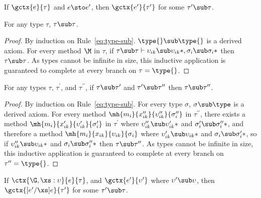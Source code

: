 \begin{theorem}[Preservation]\label{th:preservation}
  If $\gctx{e}{\tau}$ and $e \sto e^\prime$, then $\gctx{e^\prime}{\tau^\prime}$
  for some $\tau^\prime \sub \tau$.

  \begin{lemma}\label{lem:sub-reflexive}
    For any type $\tau$, $\tau \sub \tau$.

    \begin{proof}
      By induction on Rule~\ref{eq:type-sub}.  $\type{} \sub \type{}$ is a
      derived axiom.  For every method $\M$ in $\tau$, if $\tau \sub \tau \vdash
      \*\upsilon_{ik} \sub \upsilon_{ik}*, \*\sigma_i \sub \sigma_i*$ then $\tau
      \sub \tau$.  As types cannot be infinite in size, this inductive
      application is guaranteed to complete at every branch on $\tau = \type{}$.
    \end{proof}
  \end{lemma}

  \begin{lemma}\label{lem:sub-transitive}
    For any types $\tau$, $\tau^\prime$, and $\tau^{\prime\prime}$, if $\tau
    \sub \tau^\prime$ and $\tau^\prime \sub \tau^{\prime\prime}$ then $\tau \sub
    \tau^{\prime\prime}$.

    \begin{proof}
      By induction on Rule~\ref{eq:type-sub}.  For every type $\sigma$, $\sigma
      \sub \type$ is a derived axiom.  For every method
      $\mh{m_i}{x_{ik}^{\prime\prime}}{\upsilon_{ik}^{\prime\prime}}
      {\sigma_i^{\prime\prime}}$ in $\tau^{\prime\prime}$, there exists a method
      $\mh{m_i}{x_{ik}^\prime}{\upsilon_{ik}^\prime}{\sigma_i^\prime}$ in
      $\tau^\prime$ where $\*\upsilon_{ik}^{\prime\prime} \sub
      \upsilon_{ik}^\prime*$ and $\*\sigma_i^\prime \sub
      \sigma_i^{\prime\prime}*$, and therefore a method
      $\mh{m_i}{x_{ik}}{\upsilon_{ik}}{\sigma_i}$ where $\*\upsilon_{ik}^\prime
      \sub \upsilon_{ik}*$ and $\*\sigma_i \sub \sigma_i^\prime*$, so if
      $\*\upsilon_{ik}^{\prime\prime} \sub \upsilon_{ik}*$ and $\*\sigma_i \sub
      \sigma_i^{\prime\prime}*$ then $\tau \sub \tau^{\prime\prime}$.  As types
      cannot be infinite in size, this inductive application is guaranteed to
      complete at every branch on $\tau^{\prime\prime} = \type{}$.
    \end{proof}
  \end{lemma}

  \begin{lemma}\label{lem:preservation}
    If $\ctx{\G, \xs : \upsilon}{e}{\tau}$, and
    $\gctx{e^\prime}{\upsilon^\prime}$ where $\upsilon^\prime \sub \upsilon$,
    then $\gctx{[e^\prime/\xs]e}{\tau^\prime}$ for some $\tau^\prime \sub \tau$.


\end{lemma}
\end{theorem}
